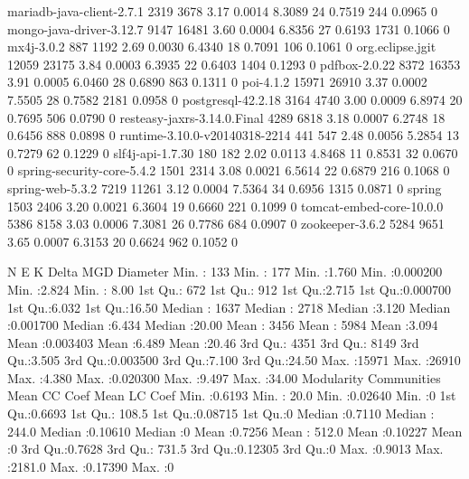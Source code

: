 \documentclass[12pt, a4paper]{article}
\begin{document}
mariadb-java-client-2.7.1      2319  3678 3.17 0.0014 8.3089 24       0.7519      244        0.0965    0  
mongo-java-driver-3.12.7       9147 16481 3.60 0.0004 6.8356 27       0.6193     1731        0.1066    0  
mx4j-3.0.2                      887  1192 2.69 0.0030 6.4340 18       0.7091      106        0.1061    0  
org.eclipse.jgit              12059 23175 3.84 0.0003 6.3935 22       0.6403     1404        0.1293    0  
pdfbox-2.0.22                  8372 16353 3.91 0.0005 6.0460 28       0.6890      863        0.1311    0  
poi-4.1.2                     15971 26910 3.37 0.0002 7.5505 28       0.7582     2181        0.0958    0  
postgresql-42.2.18             3164  4740 3.00 0.0009 6.8974 20       0.7695      506        0.0790    0  
resteasy-jaxrs-3.14.0.Final    4289  6818 3.18 0.0007 6.2748 18       0.6456      888        0.0898    0  
runtime-3.10.0-v20140318-2214   441   547 2.48 0.0056 5.2854 13       0.7279       62        0.1229    0  
slf4j-api-1.7.30                180   182 2.02 0.0113 4.8468 11       0.8531       32        0.0670    0  
spring-security-core-5.4.2     1501  2314 3.08 0.0021 6.5614 22       0.6879      216        0.1068    0  
spring-web-5.3.2               7219 11261 3.12 0.0004 7.5364 34       0.6956     1315        0.0871    0  
spring                         1503  2406 3.20 0.0021 6.3604 19       0.6660      221        0.1099    0  
tomcat-embed-core-10.0.0       5386  8158 3.03 0.0006 7.3081 26       0.7786      684        0.0907    0  
zookeeper-3.6.2                5284  9651 3.65 0.0007 6.3153 20       0.6624      962        0.1052    0  

N               E               K             Delta               MGD           Diameter    
Min.   :  133   Min.   :  177   Min.   :1.760   Min.   :0.000200   Min.   :2.824   Min.   : 8.00  
1st Qu.:  672   1st Qu.:  912   1st Qu.:2.715   1st Qu.:0.000700   1st Qu.:6.032   1st Qu.:16.50  
Median : 1637   Median : 2718   Median :3.120   Median :0.001700   Median :6.434   Median :20.00  
Mean   : 3456   Mean   : 5984   Mean   :3.094   Mean   :0.003403   Mean   :6.489   Mean   :20.46  
3rd Qu.: 4351   3rd Qu.: 8149   3rd Qu.:3.505   3rd Qu.:0.003500   3rd Qu.:7.100   3rd Qu.:24.50  
Max.   :15971   Max.   :26910   Max.   :4.380   Max.   :0.020300   Max.   :9.497   Max.   :34.00  
  Modularity      Communities      Mean CC Coef      Mean LC Coef
Min.   :0.6193   Min.   :  20.0   Min.   :0.02640   Min.   :0    
1st Qu.:0.6693   1st Qu.: 108.5   1st Qu.:0.08715   1st Qu.:0    
Median :0.7110   Median : 244.0   Median :0.10610   Median :0    
Mean   :0.7256   Mean   : 512.0   Mean   :0.10227   Mean   :0    
3rd Qu.:0.7628   3rd Qu.: 731.5   3rd Qu.:0.12305   3rd Qu.:0    
Max.   :0.9013   Max.   :2181.0   Max.   :0.17390   Max.   :0 
\end{document}
